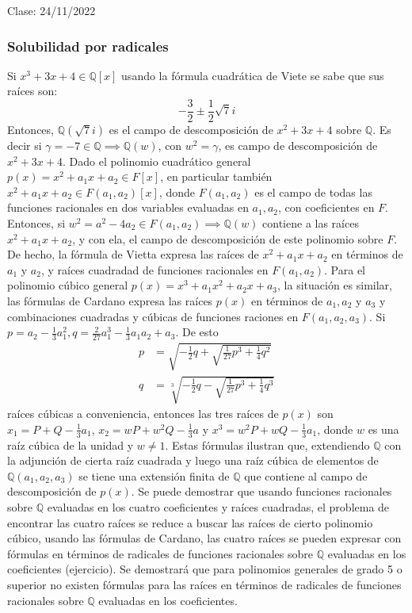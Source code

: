 Clase: 24/11/2022

\subsubsection{Solubilidad por radicales}

\begin{nota}
    Si $x^3+3x+4\in \mathbb{Q}[x]$ usando la fórmula cuadrática de Viete se sabe que sus raíces son:
    $$-\frac{3}{2}\pm \frac{1}{2}\sqrt{7}i$$
    Entonces, $\mathbb{Q}(\sqrt{7}i)$ es el campo de descomposición de $x^2+3x+4$ sobre $\mathbb{Q}$. Es decir si $\gamma=-7\in \mathbb{Q}\implies \mathbb{Q}(w)$, con $w^2=\gamma$, es campo de descomposición de $x^2+3x+4$.
    Dado el polinomio cuadrático general $p(x)=x^2+a_1x+a_2\in F[x]$, en particular también $x^2+a_1x+a_2\in F(a_1,a_2)[x]$, donde $F(a_1,a_2)$ es el campo de todas las funciones racionales en dos variables evaluadas en $a_1,a_2$, con coeficientes en $F$. Entonces, si $w^2=a^2-4a_2\in F(a_1,a_2)\implies \mathbb{Q}(w)$ contiene a las raíces $x^2+a_1x+a_2$, y con ela, el campo de descomposición de este polinomio sobre $F$. De hecho, la fórmula de Vietta expresa las raíces de $x^2+a_1x+a_2$ en términos de $a_1$ y $a_2$, y raíces cuadradad de funciones racionales en $F(a_1,a_2)$. 
    Para el polinomio cúbico general $p(x)=x^3+a_1x^2+a_2x+a_3$, la situación es similar, las fórmulas de Cardano expresa las raíces $p(x)$ en términos de $a_1,a_2$ y $a_3$ y combinaciones cuadradas y cúbicas de funciones raciones en $F(a_1,a_2,a_3)$. Si 
    $p=a_2-\frac{1}{3}a_1^2,q=\frac{2}{27}a_1^3-\frac{1}{3}a_1a_2+a_3$. De esto
    \begin{align*}
        p&=\sqrt{-\frac{1}{2}q+\sqrt{\frac{1}{27}p^3+\frac{1}{4}q^2}}\\
        q&= \sqrt[3]{-\frac{1}{2}q-\sqrt{\frac{1}{27}p^3+\frac{1}{4}q^3}}
    \end{align*} 
    raíces cúbicas a conveniencia, entonces las tres raíces de $p(x)$ son $x_1=P+Q-\frac{1}{3}a_1$, $x_2=wP+w^2Q-\frac{1}{3}a$ y $x^3=w^2P+wQ-\frac{1}{3}a_1$, donde $w$ es una raíz cúbica de la unidad y $w\neq 1$. Estas fórmulas ilustran que, extendiendo $\mathbb{Q}$ con la adjunción de cierta raíz cuadrada y luego una raíz cúbica de elementos de $\mathbb{Q}(a_1,a_2,a_3)$ se tiene una extensión finita de $\mathbb{Q}$ que contiene al campo de descomposición de $p(x)$. 
    Se puede demostrar que usando funciones racionales sobre $\mathbb{Q}$ evaluadas en los cuatro coeficientes y raíces cuadradas, el problema de encontrar las cuatro raíces se reduce a buscar las raíces de cierto polinomio cúbico, usando las fórmulas de Cardano, las cuatro raíces se pueden expresar con fórmulas en términos de radicales de funciones racionales sobre $\mathbb{Q}$ evaluadas en los coeficientes (ejercicio). 
    Se demostrará que para polinomios generales de grado 5 o superior no existen fórmulas para las raíces en términos de radicales de funciones racionales sobre $\mathbb{Q}$ evaluadas en los coeficientes.
\end{nota}

